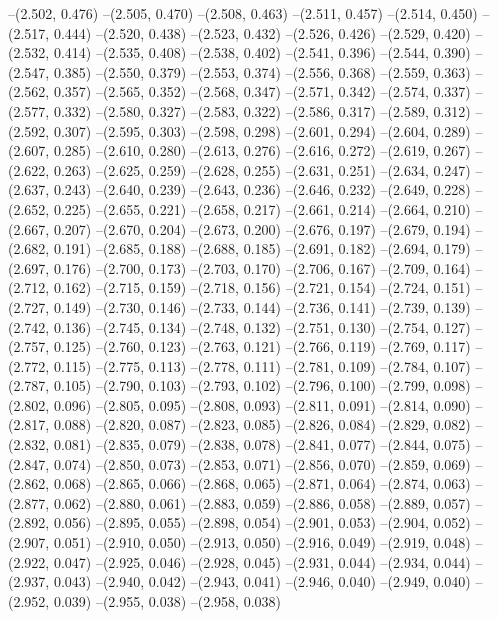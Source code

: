 --(2.502, 0.476)
--(2.505, 0.470)
--(2.508, 0.463)
--(2.511, 0.457)
--(2.514, 0.450)
--(2.517, 0.444)
--(2.520, 0.438)
--(2.523, 0.432)
--(2.526, 0.426)
--(2.529, 0.420)
--(2.532, 0.414)
--(2.535, 0.408)
--(2.538, 0.402)
--(2.541, 0.396)
--(2.544, 0.390)
--(2.547, 0.385)
--(2.550, 0.379)
--(2.553, 0.374)
--(2.556, 0.368)
--(2.559, 0.363)
--(2.562, 0.357)
--(2.565, 0.352)
--(2.568, 0.347)
--(2.571, 0.342)
--(2.574, 0.337)
--(2.577, 0.332)
--(2.580, 0.327)
--(2.583, 0.322)
--(2.586, 0.317)
--(2.589, 0.312)
--(2.592, 0.307)
--(2.595, 0.303)
--(2.598, 0.298)
--(2.601, 0.294)
--(2.604, 0.289)
--(2.607, 0.285)
--(2.610, 0.280)
--(2.613, 0.276)
--(2.616, 0.272)
--(2.619, 0.267)
--(2.622, 0.263)
--(2.625, 0.259)
--(2.628, 0.255)
--(2.631, 0.251)
--(2.634, 0.247)
--(2.637, 0.243)
--(2.640, 0.239)
--(2.643, 0.236)
--(2.646, 0.232)
--(2.649, 0.228)
--(2.652, 0.225)
--(2.655, 0.221)
--(2.658, 0.217)
--(2.661, 0.214)
--(2.664, 0.210)
--(2.667, 0.207)
--(2.670, 0.204)
--(2.673, 0.200)
--(2.676, 0.197)
--(2.679, 0.194)
--(2.682, 0.191)
--(2.685, 0.188)
--(2.688, 0.185)
--(2.691, 0.182)
--(2.694, 0.179)
--(2.697, 0.176)
--(2.700, 0.173)
--(2.703, 0.170)
--(2.706, 0.167)
--(2.709, 0.164)
--(2.712, 0.162)
--(2.715, 0.159)
--(2.718, 0.156)
--(2.721, 0.154)
--(2.724, 0.151)
--(2.727, 0.149)
--(2.730, 0.146)
--(2.733, 0.144)
--(2.736, 0.141)
--(2.739, 0.139)
--(2.742, 0.136)
--(2.745, 0.134)
--(2.748, 0.132)
--(2.751, 0.130)
--(2.754, 0.127)
--(2.757, 0.125)
--(2.760, 0.123)
--(2.763, 0.121)
--(2.766, 0.119)
--(2.769, 0.117)
--(2.772, 0.115)
--(2.775, 0.113)
--(2.778, 0.111)
--(2.781, 0.109)
--(2.784, 0.107)
--(2.787, 0.105)
--(2.790, 0.103)
--(2.793, 0.102)
--(2.796, 0.100)
--(2.799, 0.098)
--(2.802, 0.096)
--(2.805, 0.095)
--(2.808, 0.093)
--(2.811, 0.091)
--(2.814, 0.090)
--(2.817, 0.088)
--(2.820, 0.087)
--(2.823, 0.085)
--(2.826, 0.084)
--(2.829, 0.082)
--(2.832, 0.081)
--(2.835, 0.079)
--(2.838, 0.078)
--(2.841, 0.077)
--(2.844, 0.075)
--(2.847, 0.074)
--(2.850, 0.073)
--(2.853, 0.071)
--(2.856, 0.070)
--(2.859, 0.069)
--(2.862, 0.068)
--(2.865, 0.066)
--(2.868, 0.065)
--(2.871, 0.064)
--(2.874, 0.063)
--(2.877, 0.062)
--(2.880, 0.061)
--(2.883, 0.059)
--(2.886, 0.058)
--(2.889, 0.057)
--(2.892, 0.056)
--(2.895, 0.055)
--(2.898, 0.054)
--(2.901, 0.053)
--(2.904, 0.052)
--(2.907, 0.051)
--(2.910, 0.050)
--(2.913, 0.050)
--(2.916, 0.049)
--(2.919, 0.048)
--(2.922, 0.047)
--(2.925, 0.046)
--(2.928, 0.045)
--(2.931, 0.044)
--(2.934, 0.044)
--(2.937, 0.043)
--(2.940, 0.042)
--(2.943, 0.041)
--(2.946, 0.040)
--(2.949, 0.040)
--(2.952, 0.039)
--(2.955, 0.038)
--(2.958, 0.038)
